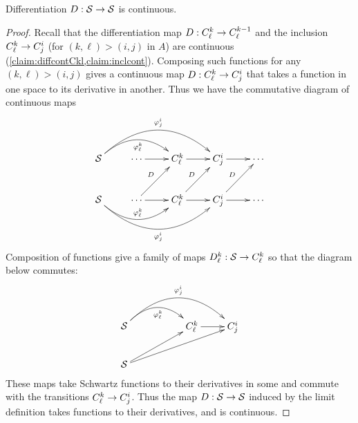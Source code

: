       \begin{thm}
        Differentiation $D:\S\rightarrow\S$ is continuous.
      \end{thm}
      \begin{proof}
        Recall that the differentiation map $D:\Ckl\rightarrow\Ckml$ and the inclusion $\Ckl\rightarrow\Cij$ (for $(k,\ell)>(i,j)$ in $A$) are continuous (\cref{claim:diffcontCkl,claim:inclcont}).
         Composing such functions for any $(k,\ell)>(i,j)$ gives a continuous map $D:\Ckl\rightarrow\Cij$ that takes a function in one space to its derivative in another.
        Thus we have the commutative diagram of continuous maps
        \begin{displaymath}
          \xymatrix{
            \S \ar@/^20pt/[rr]_{\varphi^k_\ell} \ar@/^30pt/[rrr]^{\varphi^i_j} & \cdots \ar[r] & \Ckl \ar[r] & \Cij \ar[r] & \cdots \\
            \S \ar@/_20pt/[rr]^{\varphi^k_\ell} \ar@/_30pt/[rrr]_{\varphi^i_j} & \cdots \ar[r] \ar[ur]^D & \Ckl \ar[r] \ar[ur]^D & \Cij \ar[r] \ar[ur]^D & \cdots\\
          }
        \end{displaymath}
        Composition of functions give a family of maps $D^k_\ell:\S\rightarrow\Ckl$ so that the diagram below commutes:
        \begin{displaymath}
          \xymatrix{
            \S \ar@/^20pt/[rr]_{\varphi^k_\ell} \ar@/^30pt/[rrr]^{\varphi^i_j} && \Ckl \ar[r] & \Cij \\
            \S \ar[urr] \ar[urrr] \\
          }
        \end{displaymath}
        These maps take Schwartz functions to their derivatives in some \Ckl and commute with the transitions $\Ckl\rightarrow\Cij$.
        Thus the map $D:\S\rightarrow\S$ induced by the limit definition takes functions to their derivatives, and is continuous.
      \end{proof}

